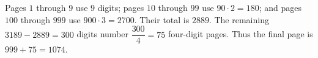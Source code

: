 Pages $1$ through $9$ use $9$ digits; pages $10$ through $99$ use $90\cdot2=180$; and pages $100$ through $999$ use $900\cdot3=2700$. Their total is $2889$. The remaining $3189-2889=300$ digits number $\dfrac{300}{4}=75$ four-digit pages. Thus the final page is $\boxed{999+75=1074}$.
